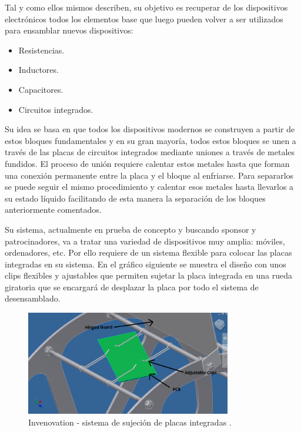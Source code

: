 Tal y como ellos mismos describen, su objetivo es recuperar de los dispositivos electrónicos todos los elementos base que luego pueden volver a ser utilizados para ensamblar nuevos dispositivos:

\begin{itemize}

\item{Resistencias.}
\item{Inductores.}
\item{Capacitores.}
\item{Circuitos integrados.}

\end{itemize}

Su idea se basa en que todos los dispositivos modernos se construyen a partir de estos bloques fundamentales y en su gran mayoría, todos estos bloques se unen a través de las placas de circuitos integrados mediante uniones a través de metales fundidos. El proceso de unión requiere calentar estos metales hasta que forman una conexión permanente entre la placa y el bloque al enfriarse. Para separarlos se puede seguir el mismo procedimiento y calentar esos metales hasta llevarlos a su estado líquido facilitando de esta manera la separación de los bloques anteriormente comentados. 

Su sistema, actualmente en prueba de concepto y buscando sponsor y patrocinadores, va a tratar una variedad de dispositivos muy amplia: móviles, ordenadores, etc. Por ello requiere de un sistema flexible para colocar las placas integradas en su sistema. En el gráfico siguiente se muestra el diseño con unos clips flexibles y ajustables que permiten sujetar la placa integrada en una rueda giratoria que se encargará de desplazar la placa por todo el sistema de desensamblado.

\begin{figure}[H]
\begin{center}
\includegraphics[width=0.8\textwidth]{img/D1}
\caption{Invenovation - sistema de sujeción de placas integradas \cite{invenovation}.}
\end{center}
\end{figure}


